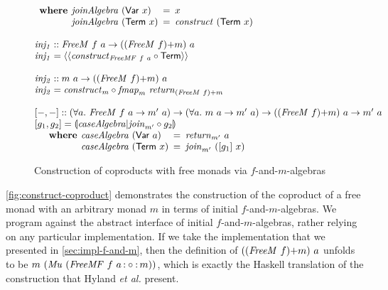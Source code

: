 \documentclass{jfp1}
\newcommand{\eFold}[2]{\llparenthesis #1|#2 \rrparenthesis}
\newcommand{\fmext}[1]{\langle\langle #1 \rangle\rangle}
\newcommand{\kw}[1]{\textbf{#1}}
\begin{document}
\begin{figure}
\begin{displaymath}
\begin{array}{@{}l}
\begin{array}{@{}l}
\begin{array}{r@{\hspace{0.4em}}l@{\hspace{0.5em}}c@{\hspace{0.5em}}l}
          \kw{where} & \mathit{joinAlgebra}~(\mathsf{Var}~x) &=& x \\
          & \mathit{joinAlgebra}~(\mathsf{Term}~x) &=& \mathit{construct}~(\mathsf{Term}~x)
        \end{array}
      \end{array} \\
      \\
      \mathit{inj_1} :: \mathit{FreeM}~f~a \to (\cprd{(\mathit{FreeM}~f)}{m})~a \\
      \mathit{inj_1} = \fmext{\mathit{construct}_{\mathit{FreeMF}~f~a} \circ \mathsf{Term}} \\
      \\
      \mathit{inj_2} :: m~a \to (\cprd{(\mathit{FreeM}~f)}{m})~a \\
      \mathit{inj_2} = \mathit{construct}_m \circ \mathit{fmap}_m~\mathit{return}_{\cprd{(\mathit{FreeM}~f)}{m}}\\
      \\
      \begin{array}{@{}l}
        {}[-,-] :: (\forall a.~\mathit{FreeM}~f~a \to m'~a) \to (\forall a.~m~a \to m'~a) \to (\cprd{(\mathit{FreeM}~f)}{m})~a \to m'~a \\
        {}[g_1,g_2] = \eFold{\mathit{caseAlgebra}}{\mathit{join}_{m'} \circ g_2} \\
        \quad\begin{array}{r@{\hspace{0.4em}}l@{\hspace{0.5em}}c@{\hspace{0.5em}}l}
          \kw{where} & \mathit{caseAlgebra}~(\mathsf{Var}~a) &=& \mathit{return}_{m'}~a \\
          & \mathit{caseAlgebra}~(\mathsf{Term}~x) &=& \mathit{join}_{m'}~([g_1]~x)
        \end{array}
      \end{array}
    \end{array}
  \end{displaymath}
  \caption{Construction of coproducts with free monads via $f$-and-$m$-algebras}
  \label{fig:construct-coproduct}
\end{figure}

\autoref{fig:construct-coproduct} demonstrates the construction of the
coproduct of a free monad with an arbitrary monad $m$ in terms of
initial $f$-and-$m$-algebras. We program against the abstract
interface of initial $f$-and-$m$-algebras, rather relying on any
particular implementation. If we take the implementation that we
presented in \autoref{sec:impl-f-and-m}, then the definition of
$((\mathit{FreeM}~f)\mathord{+}m)~a$ unfolds to be
$m~(\mathit{Mu}~(\mathit{FreeMF}~f~a \mathop{\mathord:\circ\mathord:} m))$, which is exactly
the Haskell translation of the construction that Hyland \emph{et al.}
present.
\end{document}
